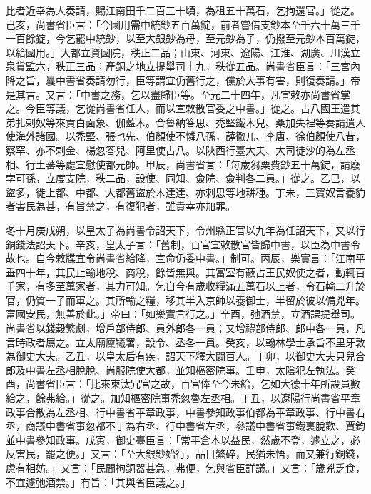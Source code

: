 \begin{pinyinscope}
比者近幸為人奏請，賜江南田千二百三十頃，為租五十萬石，乞拘還官。」從之。己亥，尚書省臣言：「今國用需中統鈔五百萬錠，前者嘗借支鈔本至千六十萬三千一百餘錠，今乞罷中統鈔，以至大銀鈔為母，至元鈔為子，仍撥至元鈔本百萬錠，以給國用。」大都立資國院，秩正二品；山東、河東、遼陽、江淮、湖廣、川漢立泉貨監六，秩正三品；產銅之地立提舉司十九，秩從五品。尚書省臣言：「三宮內降之旨，曩中書省奏請勿行，臣等謂宜仍舊行之，儻於大事有害，則復奏請。」帝是其言。又言：「中書之務，乞以盡歸臣等。至元二十四年，凡宣敕亦尚書省掌之。今臣等議，乞從尚書省任人，而以宣敕散官委之中書。」從之。占八國王遣其弟扎剌奴等來貢白面象、伽藍木。合魯納答思、禿堅鐵木兒、桑加失裡等奏請遣人使海外諸國。以禿堅、張也先、伯顏使不憐八孫，薛徹兀、李唐、徐伯顏使八昔，察罕、亦不剌金、楊忽答兒、阿里使占八。以陜西行臺大夫、大司徒沙的為左丞相、行土蕃等處宣慰使都元帥。甲辰，尚書省言：「每歲芻粟費鈔五十萬錠，請廢孛可孫，立度支院，秩二品，設使、同知、僉院、僉判各二員。」從之。乙巳，以盜多，徙上都、中都、大都舊盜於木達達、亦剌思等地耕種。丁未，三寶奴言養豹者害民為甚，有旨禁之，有復犯者，雖貴幸亦加罪。



 冬十月庚戌朔，以皇太子為尚書令詔天下，令州縣正官以九年為任詔天下，又以行銅錢法詔天下。辛亥，皇太子言：「舊制，百官宣敕散官皆歸中書，以臣為中書令故也。自今敕牒宜令尚書省給降，宣命仍委中書。」制可。丙辰，樂實言：「江南平垂四十年，其民止輸地稅、商稅，餘皆無與。其富室有蔽占王民奴使之者，動輒百千家，有多至萬家者，其力可知。乞自今有歲收糧滿五萬石以上者，令石輸二升於官，仍質一子而軍之。其所輸之糧，移其半入京師以養御士，半留於彼以備兇年。富國安民，無善於此。」帝曰：「如樂實言行之。」辛酉，弛酒禁，立酒課提舉司。尚書省以錢穀繁劇，增戶部侍郎、員外郎各一員；又增禮部侍郎、郎中各一員，凡言時政者屬之。立太廟廩犧署，設令、丞各一員。癸亥，以翰林學士承旨不里牙敦為御史大夫。乙丑，以皇太后有疾，詔天下釋大闢百人。丁卯，以御史大夫只兒合郎及中書左丞相脫脫、尚服院使大都，並知樞密院事。壬申，太陰犯左執法。癸酉，尚書省臣言：「比來柬汰冗官之故，百官俸至今未給，乞如大德十年所設員數給之，餘弗給。」從之。加知樞密院事禿忽魯左丞相。丁丑，以遼陽行尚書省平章政事合散為左丞相、行中書省平章政事，中書參知政事伯都為平章政事、行中書右丞，商議中書省事忽都不丁為右丞、行中書省左丞，參議中書省事鐵裏脫歡、賈鈞並中書參知政事。戊寅，御史臺臣言：「常平倉本以益民，然歲不登，遽立之，必反害民，罷之便。」又言：「至大銀鈔始行，品目繁碎，民猶未悟，而又兼行銅錢，慮有相妨。」又言：「民間拘銅器甚急，弗便，乞與省臣詳議。」又言：「歲兇乏食，不宜遽弛酒禁。」有旨：「其與省臣議之。」




\end{pinyinscope}
